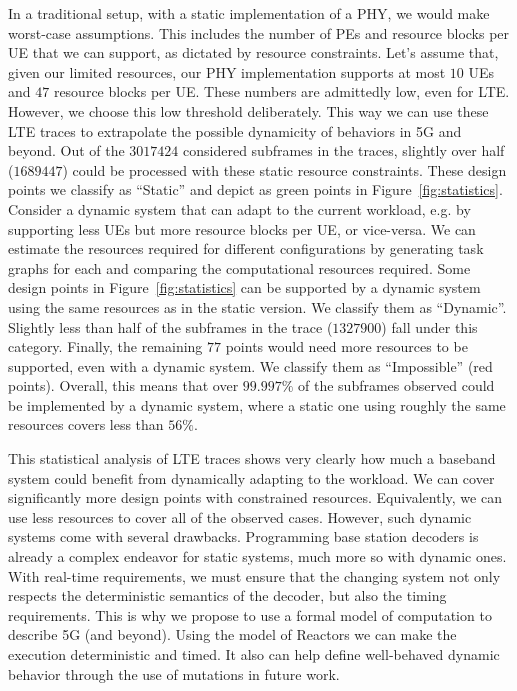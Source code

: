 In a traditional setup, with a static implementation of a \acs{PHY}, we would make worst-case assumptions.
This includes the number of \acp{PE} and resource blocks per \ac{UE} that we can support, as dictated by resource constraints.
Let's assume that, given our limited resources, our \acs{PHY} implementation supports at most $10$ \acp{UE} and $47$ resource blocks per \ac{UE}.
These numbers are admittedly low, even for \acs{LTE}.
However, we choose this low threshold deliberately.
This way we can use these \ac{LTE} traces to extrapolate the possible dynamicity of behaviors in 5G and beyond.
Out of the $3017424$ considered subframes in the traces, slightly over half ($1689447$) could be processed with these static resource constraints.
These design points we classify as ``Static'' and depict as green points in Figure~\ref{fig:statistics}.
Consider a dynamic system that can adapt to the current workload, e.g. by supporting less \acp{UE} but more resource blocks per \ac{UE}, or vice-versa.
We can estimate the resources required for different configurations by generating task graphs for each and comparing the computational resources required.
Some design points in Figure~\ref{fig:statistics} can be supported by a dynamic system using the same resources as in the static version.
We classify them as ``Dynamic''.
Slightly less than half of the subframes in the trace ($1327900$) fall under this category.
Finally, the remaining $77$ points would need more resources to be supported, even with a dynamic system.
We classify them as ``Impossible'' (red points).
Overall, this means that over $99.997\%$ of the subframes observed could be implemented by a dynamic system, where a static one using roughly the same resources covers less than $56\%$.

This statistical analysis of LTE traces shows very clearly how much a baseband system could benefit from dynamically adapting to the workload.
We can cover significantly more design points with constrained resources. Equivalently, we can use less resources to cover all of the observed cases.
However, such dynamic systems come with several drawbacks.
Programming base station decoders is already a complex endeavor for static systems, much more so with dynamic ones.
With real-time requirements, we must ensure that the changing system not only respects the deterministic semantics of the decoder, but also the timing requirements.
This is why we propose to use a formal model of computation to describe 5G (and beyond). Using the model of Reactors we can make the execution deterministic and timed.
It also can help define well-behaved dynamic behavior through the use of mutations in future work.

